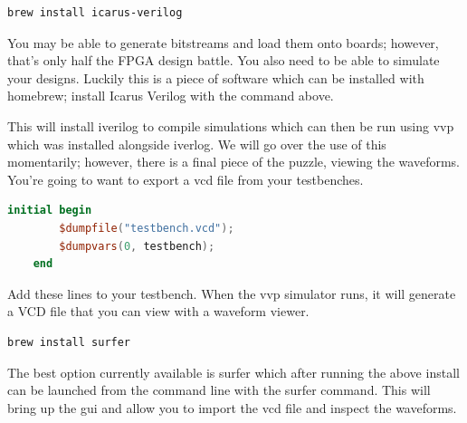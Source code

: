 

\begin{lstlisting}[language=bash]
    brew install icarus-verilog
\end{lstlisting}

You may be able to generate bitstreams and load them onto boards; however, that's only half the FPGA design battle.
You also need to be able to simulate your designs. 
Luckily this is a piece of software which can be installed with homebrew; 
install Icarus Verilog with the command above. 


This will install iverilog to compile simulations which can then be run using vvp which was installed alongside iverlog.
We will go over the use of this momentarily; however, there is a final piece of the puzzle, viewing the waveforms.
You're going to want to export a vcd file from your testbenches.  

\begin{lstlisting}[language=verilog]
    initial begin
        $dumpfile("testbench.vcd");
        $dumpvars(0, testbench);
    end
\end{lstlisting}

Add these lines to your testbench. 
When the vvp simulator runs, it will generate a VCD file that you can view with a waveform viewer.


\begin{lstlisting}[language=bash]
    brew install surfer
\end{lstlisting}

The best option currently available is surfer which after running the above install can be launched from the command line with the surfer command. 
This will bring up the gui and allow you to import the vcd file and inspect the waveforms.